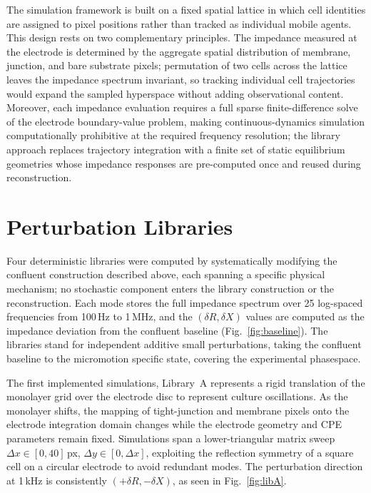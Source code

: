 \documentclass[english, 10pt, a4paper]{article}
\def\SI#1#2{#1\,#2}%
\newcommand{\dR}{\ensuremath{\delta R}}
\newcommand{\dX}{\ensuremath{\delta X}}
\begin{document}
The simulation framework is built on a fixed spatial lattice in which cell identities are assigned to pixel positions rather than tracked as individual mobile agents. This design rests on two complementary principles. The impedance measured at the electrode is determined by the aggregate spatial distribution of membrane, junction, and bare substrate pixels; permutation of two cells across the lattice leaves the impedance spectrum invariant, so tracking individual cell trajectories would expand the sampled hyperspace without adding observational content. Moreover, each impedance evaluation requires a full sparse finite-difference solve of the electrode boundary-value problem, making continuous-dynamics simulation computationally prohibitive at the required frequency resolution; the library approach replaces trajectory integration with a finite set of static equilibrium geometries whose impedance responses are pre-computed once and reused during reconstruction.

\section{Perturbation Libraries}
\label{sec:libraries}

Four deterministic libraries were computed by systematically modifying the confluent construction described above, each spanning a specific physical mechanism; no stochastic component enters the library construction or the reconstruction. Each mode stores the full impedance spectrum over 25 log-spaced frequencies from 100\,Hz to 1\,MHz, and the $(\delta R, \delta X)$ values are computed as the impedance deviation from the confluent baseline (Fig.~\ref{fig:baseline}). The libraries stand for independent additive small perturbations, taking the confluent baseline to the micromotion specific state, covering the experimental phasespace.

The first implemented simulations, Library~A represents a rigid translation of the monolayer grid over the electrode disc to represent culture oscillations. As the monolayer shifts, the mapping of tight-junction and membrane pixels onto the electrode integration domain changes while the electrode geometry and CPE parameters remain fixed. Simulations span a lower-triangular matrix sweep $\Delta x \in [0,40]$\,px, $\Delta y \in [0,\Delta x]$, exploiting the reflection symmetry of a square cell on a circular electrode to avoid redundant modes. The perturbation direction at \SI{1}{kHz} is consistently $(+\dR, -\dX)$, as seen in Fig.~\ref{fig:libA}.
\end{document}
